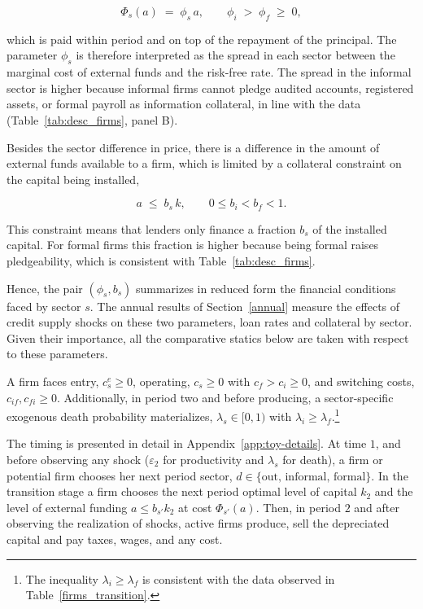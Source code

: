 \documentclass[12pt]{article}
\begin{document}
\begin{equation}
  \Phi_{s}(a) \;=\; \phi_{s}\,a , \qquad
  \phi_{i} \;>\; \phi_{f}\;\geq\;0 ,
  \label{eq:toy-fincost}
\end{equation}

which is paid within period and on top of the repayment of the principal. The parameter $\phi_{s}$ is therefore interpreted as the spread in each sector between the marginal cost of external funds and the risk-free rate. The spread in the informal sector is higher because informal firms cannot pledge audited accounts, registered assets, or formal payroll as information collateral, in line with the data (Table~\ref{tab:desc_firms}, panel B).

Besides the sector difference in price, there is a difference in the amount of external funds available to a firm, which is limited by a collateral constraint on the capital being installed,

\begin{equation}
  a \;\leq\; b_{s}\,k , \qquad 0\leq b_{i} <
  b_{f} < 1 .
  \label{eq:toy-collateral}
\end{equation}

This constraint means that lenders only finance a fraction $b_{s}$ of the installed capital. For formal firms this fraction is higher because being formal raises pledgeability, which is consistent with Table~\ref{tab:desc_firms}.

Hence, the pair $(\phi_{s},b_{s})$ summarizes in reduced form the financial conditions faced by sector $s$. The annual results of Section~\ref{annual} measure the effects of credit supply shocks on these two parameters, loan rates and collateral by sector. Given their importance, all the comparative statics below are taken with respect to these parameters.

A firm faces entry, $c^{e}_{s}\geq0$, operating, $c_{s}\geq0$ with $c_{f}>c_{i} \geq 0$, and switching costs, $c_{if},c_{fi}\geq0$. Additionally, in period two and before producing, a sector-specific exogenous death probability materializes, $\lambda_{s}\in[0,1)$ with $\lambda_{i}\geq\lambda_{f}$.\footnote{The inequality $\lambda_{i}\geq\lambda_{f}$ is consistent with the data observed in Table~\ref{firms_transition}.}

The timing is presented in detail in Appendix~\ref{app:toy-details}. At time $1$, and before observing any shock ($\varepsilon_2$ for productivity and $\lambda_s$ for death), a firm or potential firm chooses her next period sector, $d \in \{\text{out, informal, formal}\}$. In the transition stage a firm chooses the next period optimal level of capital $k_2$ and the level of external funding $a \leq b_{s'}k_2$ at cost $\Phi_{s'}(a)$. Then, in period $2$ and after observing the realization of shocks, active firms produce, sell the depreciated capital and pay taxes, wages, and any cost.
\end{document}
